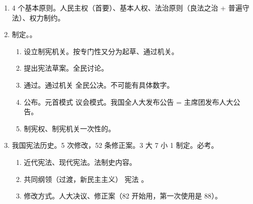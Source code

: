 \begin{enumerate}
\begin{enumerate}
          \item 有无统一的宪法典。成文、不成文（）。蒲莱士。1787 美宪一、1791 法欧一。
          \item 效力、制定修改程序是否和普通法一样。刚性、柔性。蒲莱士。
          \item 制宪主体谁发挥主导作用。皇帝、人民、皇帝 + 人民。
                \begin{enumerate}
                  \item 钦定。。
                  \item 民定。。
                  \item 协定。。
                \end{enumerate}
        \end{enumerate}
  \item 4 个基本原则。人民主权（首要）、基本人权、法治原则（良法之治 + 普遍守法）、权力制约。
  \item 制定。。
        \begin{enumerate}
          \item 设立制宪机关。按专门性又分为起草、通过机关。
          \item 提出宪法草案。全民讨论。
          \item 通过。通过机关 \hz 全民公决。不可能有具体数字。
          \item 公布。元首模式 \hz 议会模式。我国全人大发布公告 = 主席团发布人大公告。
          \item 制宪权、制宪机关一次性的。
        \end{enumerate}
  \item 我国宪法历史。5 次修改，52 条修正案。3 大 7 小 1 制定。必考。
        \begin{enumerate}
          \item 近代宪法、现代宪法。法制史内容。
          \item 共同纲领（过渡，新民主主义）  宪法   。
          \item 修改方式。人大决议、修正案（82 开始用，第一次使用是 88）。

\end{enumerate}
\end{enumerate}
